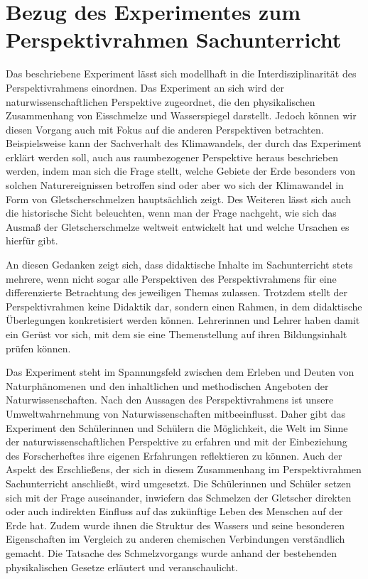 \section{Bezug des Experimentes zum Perspektivrahmen Sachunterricht}
Das beschriebene Experiment lässt sich modellhaft in die Interdisziplinarität des Perspektivrahmens einordnen.
Das Experiment an sich wird der naturwissenschaftlichen Perspektive zugeordnet, die den physikalischen Zusammenhang von Eisschmelze und Wasserspiegel darstellt.
Jedoch können wir diesen Vorgang auch mit Fokus auf die anderen Perspektiven betrachten.
Beispielsweise kann der Sachverhalt des Klimawandels, der durch das Experiment erklärt werden soll, auch aus raumbezogener Perspektive heraus beschrieben werden, indem man sich die Frage stellt, welche Gebiete der Erde besonders von solchen Naturereignissen betroffen sind oder aber wo sich der Klimawandel in Form von Gletscherschmelzen hauptsächlich zeigt.
Des Weiteren lässt sich auch die historische Sicht beleuchten, wenn man der Frage nachgeht, wie sich das Ausmaß der Gletscherschmelze weltweit entwickelt hat und welche Ursachen es hierfür gibt.

An diesen Gedanken zeigt sich, dass didaktische Inhalte im Sachunterricht stets mehrere, wenn nicht sogar alle Perspektiven des Perspektivrahmens für eine differenzierte Betrachtung des jeweiligen Themas zulassen.
Trotzdem stellt der Perspektivrahmen keine Didaktik dar, sondern einen \glqq Rahmen, in dem didaktische Überlegungen konkretisiert werden können. Lehrerinnen und Lehrer haben damit ein Gerüst vor sich, mit dem sie eine Themenstellung auf ihren Bildungsinhalt prüfen können.\grqq{}
 
Das Experiment steht im Spannungsfeld zwischen \glqq dem Erleben und Deuten von Naturphänomenen und den inhaltlichen und methodischen Angeboten der Naturwissenschaften.\grqq{}
Nach den Aussagen des Perspektivrahmens ist unsere Umweltwahrnehmung von Naturwissenschaften mitbeeinflusst.
Daher gibt das Experiment den Schülerinnen und Schülern die Möglichkeit, die Welt im Sinne der naturwissenschaftlichen Perspektive zu erfahren und mit der Einbeziehung des Forscherheftes ihre eigenen Erfahrungen reflektieren zu können.
Auch der Aspekt des \glqq Erschließens\grqq{}, der sich in diesem Zusammenhang im Perspektivrahmen Sachunterricht anschließt, wird umgesetzt.
Die Schülerinnen und Schüler setzen sich mit der Frage auseinander, inwiefern das Schmelzen der Gletscher direkten oder auch indirekten Einfluss auf das zukünftige Leben des Menschen auf der Erde hat.
Zudem wurde ihnen die Struktur des Wassers und seine besonderen Eigenschaften im Vergleich zu anderen chemischen Verbindungen verständlich gemacht.
Die Tatsache des Schmelzvorgangs wurde anhand der bestehenden physikalischen Gesetze erläutert und veranschaulicht.

